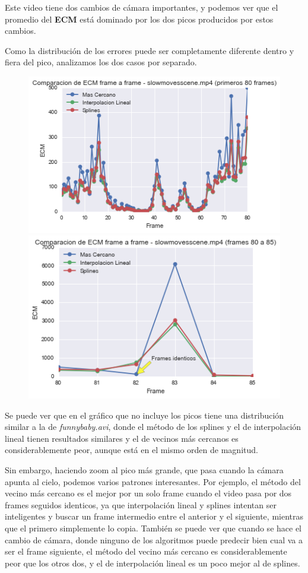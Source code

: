 Este video tiene dos cambios de c\'amara importantes, y podemos ver que el
promedio del \textbf{ECM} est\'a dominado por los dos picos producidos
por estos cambios.

Como la distribuci\'on de los errores puede ser completamente diferente dentro y
fiera del pico, analizamos los dos casos por separado.

\begin{figure}[H]
\centering
\includegraphics[width=.49\textwidth]{graficos/ecm_frame_slowmovescene_0_80.png}
\includegraphics[width=.49\textwidth]{graficos/ecm_frame_slowmovescene_80_85.png}
\end{figure}

Se puede ver que en el gr\'afico que no incluye los picos tiene una
distribuci\'on similar a la de \textit{funnybaby.avi}, donde el m\'etodo de los
splines y el de interpolaci\'on lineal tienen resultados similares y el de
vecinos m\'as cercanos es considerablemente peor, aunque est\'a en el mismo
orden de magnitud.

Sin embargo, haciendo zoom al pico m\'as grande, que pasa cuando la c\'amara
apunta al cielo, podemos varios patrones interesantes. Por ejemplo, el m\'etodo del
vecino m\'as cercano es el mejor por un solo frame cuando el video pasa por dos
frames seguidos identicos, ya que interpolaci\'on lineal y splines
intentan ser inteligentes y buscar un frame intermedio entre el anterior y el
siguiente, mientras que el primero simplemente lo copia. Tambi\'en se puede ver
que cuando se hace el cambio de c\'amara, donde ninguno de los algoritmos puede
predecir bien cual va a ser el frame siguiente, el m\'etodo del vecino m\'as
cercano es considerablemente peor que los otros dos, y el de interpolaci\'on
lineal es un poco mejor al de splines.

